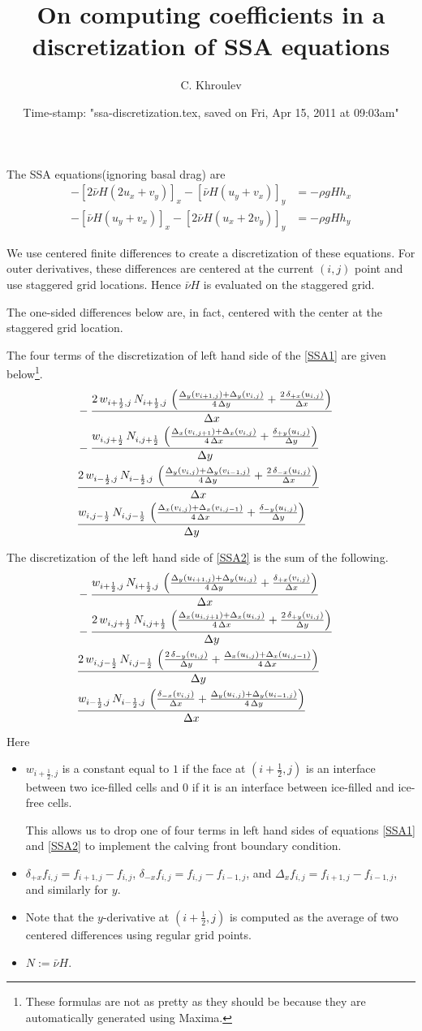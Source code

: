 \documentclass{amsart}
\date{Time-stamp: "ssa-discretization.tex, saved on Fri, Apr 15, 2011 at 09:03am"}
\begin{document}
\title{On computing coefficients in a discretization of SSA equations}
\author{C. Khroulev}
\maketitle

The SSA equations(ignoring basal drag) are
\begin{align}
-\left[ 2\bar\nu H\left( 2u_{x} + v_{y}\right)\right]_{x} - \left[\bar\nu
  H\left(u_{y}+v_{x} \right) \right]_{y} &= - \rho gH h_{x} \label{SSA1} \\
-\left[ \bar\nu H\left( u_{y} + v_{x} \right)\right]_{x} - \left[2\bar\nu
  H\left(u_{x}+2v_{y}  \right) \right]_{y} &= -\rho gH h_{y} \label{SSA2}
\end{align}

We use centered finite differences to create a discretization of these
equations. For outer derivatives, these differences are centered at the current
$(i,j)$ point and use staggered grid locations. Hence $\bar \nu H$ is evaluated on the staggered grid.

The one-sided differences below are, in fact, centered with the center at the
staggered grid location.

\medskip
The four terms of the discretization of left hand side of the \eqref{SSA1} are
given below\footnote{These formulas are not as pretty as they should be because
they are automatically generated using Maxima.}.
\begin{eqnarray*}
  \lhsI
\end{eqnarray*}

The discretization of the left hand side of \eqref{SSA2} is the sum of the following.
\begin{eqnarray*}
  \lhsII
\end{eqnarray*}

Here
\begin{itemize}
\item $w_{i+\frac12,j}$ is a constant equal to $1$ if the face at $(i+\frac12,j)$ is
  an interface between two ice-filled cells and $0$ if it is an interface
  between ice-filled and ice-free cells.

  This allows us to drop one of four terms in left hand sides of equations
  \eqref{SSA1} and \eqref{SSA2} to implement the calving front boundary
  condition.

\item $\delta_{+x}f_{i,j} = f_{i+1,j}-f_{i,j}$, $\delta_{-x}f_{i,j} =
  f_{i,j}-f_{i-1,j}$, and $\Delta_{x}f_{i,j} = f_{i+1,j}-f_{i-1,j}$, and
  similarly for $y$.
\item Note that the $y$-derivative at $(i+\frac12,j)$ is computed as the
  average of two centered differences using regular grid points.
\item $N := \bar \nu H$.
\end{itemize}
\end{document}
